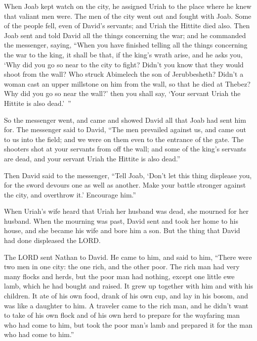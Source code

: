 \myverse{}When Joab kept watch on the city, he assigned Uriah to the place
where he knew that valiant men were.
\myverse{}The men of the city went out and fought with Joab. Some of the people fell,
even of David’s servants; and Uriah the Hittite died also.
\myverse{}Then Joab sent and told David all the things concerning the war;
\myverse{}and he commanded the messenger, saying, “When you have finished telling all
the things concerning the war to the king,
\myverse{}it shall be that, if the king’s wrath arise, and he asks you, ‘Why did you
go so near to the city to fight? Didn’t you know that they would shoot from the wall?
\myverse{}Who struck Abimelech the son of Jerubbesheth? Didn’t a woman cast an upper
millstone on him from the wall, so that he died at Thebez? Why did you go so near the wall?’ then you
shall say, ‘Your servant Uriah the Hittite is also dead.’ ”

\myverse{}So the messenger went, and came and showed David all that Joab
had sent him for.
\myverse{}The messenger said to David, “The men prevailed against us, and came out
to us into the field; and we were on them even to the entrance of the gate.
\myverse{}The shooters shot at your servants from off the wall; and some of the king’s
servants are dead, and your servant Uriah the Hittite is also dead.”

\myverse{}Then David said to the messenger, “Tell Joab, ‘Don’t let this
thing displease you, for the sword devours one as well as another. Make your battle stronger against the
city, and overthrow it.’ Encourage him.”

\myverse{}When Uriah’s wife heard that Uriah her husband was dead, she
mourned for her husband.
\myverse{}When the mourning was past, David sent and took her home to his house, and
she became his wife and bore him a son. But the thing that David had done displeased the LORD.


\mychapter{} \myverse*{}The LORD sent Nathan to David. He came to him, and said to him,
“There were two men in one city: the one rich, and the other poor.
\myverse{}The rich man had very many flocks and herds,
\myverse{}but the poor man had nothing, except one little ewe lamb, which he had bought
and raised. It grew up together with him and with his children. It ate of his own food, drank of his own
cup, and lay in his bosom, and was like a daughter to him.
\myverse{}A traveler came to the rich man, and he didn’t want to take of his own flock
and of his own herd to prepare for the wayfaring man who had come to him, but took the poor man’s lamb
and prepared it for the man who had come to him.”

